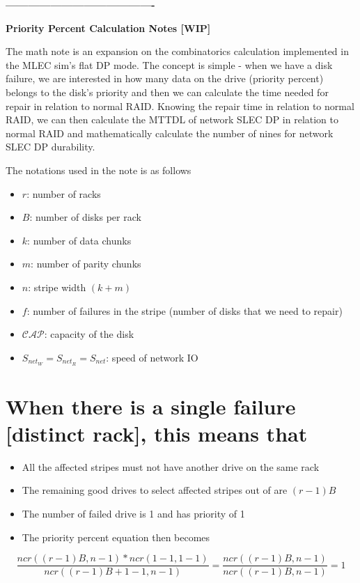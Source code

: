 \documentclass[journal]{IEEEtran}
\begin{document}
\textbf{----------------------------------------}

\textbf{Priority Percent Calculation Notes [WIP]}

The math note is an expansion on the combinatorics calculation implemented in the MLEC sim's flat DP mode. The concept is simple - when we have a disk failure, we are interested in how many data on the drive (priority percent) belongs to the disk's priority and then we can calculate the time needed for repair in relation to normal RAID. Knowing the repair time in relation to normal RAID, we can then calculate the MTTDL of network SLEC DP in relation to normal RAID and mathematically calculate the number of nines for network SLEC DP durability.\

The notations used in the note is as follows
\begin{itemize}
  \item $r$: number of racks
  \item $B$: number of disks per rack
  \item $k$: number of data chunks
  \item $m$: number of parity chunks
  \item $n$: stripe width $(k+m)$
  \item $f$: number of failures in the stripe (number of disks that we need to repair)
  \item $\mathcal{CAP}$: capacity of the disk
  \item $S_{net_W}=S_{net_R}=S_{net}$: speed of network IO
\end{itemize}


\section{When there is a single failure [distinct rack], this means that}
\begin{itemize}
  \item All the affected stripes must not have another drive on the same rack
  \item The remaining good drives to select affected stripes out of are $(r-1)B$
  \item The number of failed drive is 1 and has priority of 1
  \item The priority percent equation then becomes
\end{itemize}

\begin{equation*}
  \frac{ncr((r-1)B, n-1)*ncr(1-1, 1-1)}{ncr((r-1)B+1-1, n-1)}=\frac{ncr((r-1)B, n-1)}{ncr((r-1)B, n-1)}=1
\end{equation*}
\end{document}
